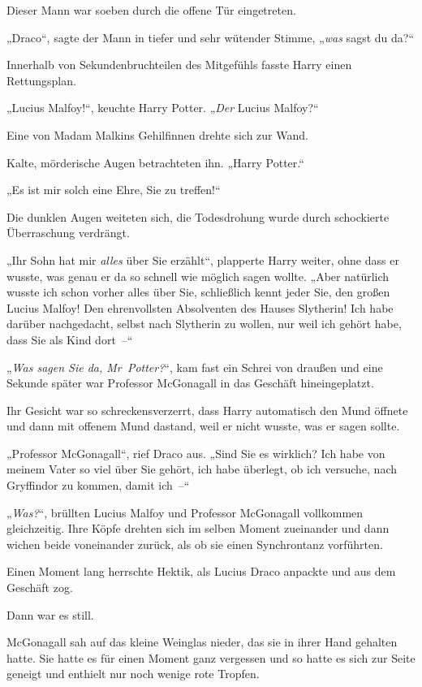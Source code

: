 {Dieser Mann war soeben durch die offene Tür eingetreten.

„Draco“, sagte der Mann in tiefer und sehr wütender Stimme, „\emph{was} sagst du da?“

Innerhalb von Sekundenbruchteilen des Mitgefühls fasste Harry einen Rettungsplan.

„Lucius Malfoy!“, keuchte Harry Potter. „\emph{Der} Lucius Malfoy?“

Eine von Madam Malkins Gehilfinnen drehte sich zur Wand.

Kalte, mörderische Augen betrachteten ihn. „Harry Potter.“

„Es ist mir solch eine Ehre, Sie zu treffen!“

Die dunklen Augen weiteten sich, die Todesdrohung wurde durch schockierte Überraschung verdrängt.

„Ihr Sohn hat mir \emph{alles} über Sie erzählt“, plapperte Harry weiter, ohne dass er wusste, was genau er da so schnell wie möglich sagen wollte. „Aber natürlich wusste ich schon vorher alles über Sie, schließlich kennt jeder Sie, den großen Lucius Malfoy! Den ehrenvollsten Absolventen des Hauses Slytherin! Ich habe darüber nachgedacht, selbst nach Slytherin zu wollen, nur weil ich gehört habe, dass Sie als Kind dort~--“

„\emph{Was sagen Sie da, Mr~Potter?}“, kam fast ein Schrei von draußen und eine Sekunde später war Professor McGonagall in das Geschäft hineingeplatzt.

Ihr Gesicht war so schreckensverzerrt, dass Harry automatisch den Mund öffnete und dann mit offenem Mund dastand, weil er nicht wusste, was er sagen sollte.

„Professor McGonagall“, rief Draco aus. „Sind Sie es wirklich? Ich habe von meinem Vater so viel über Sie gehört, ich habe überlegt, ob ich versuche, nach Gryffindor zu kommen, damit ich~--“

„\emph{Was?}“, brüllten Lucius Malfoy und Professor McGonagall vollkommen gleichzeitig. Ihre Köpfe drehten sich im selben Moment zueinander und dann wichen beide voneinander zurück, als ob sie einen Synchrontanz vorführten.

Einen Moment lang herrschte Hektik, als Lucius Draco anpackte und aus dem Geschäft zog.

Dann war es still.

McGonagall sah auf das kleine Weinglas nieder, das sie in ihrer Hand gehalten hatte. Sie hatte es für einen Moment ganz vergessen und so hatte es sich zur Seite geneigt und enthielt nur noch wenige rote Tropfen.

}
